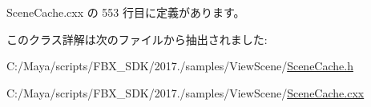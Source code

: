  Scene\+Cache.\+cxx の 553 行目に定義があります。



このクラス詳解は次のファイルから抽出されました\+:\begin{DoxyCompactItemize}
\item 
C\+:/\+Maya/scripts/\+F\+B\+X\+\_\+\+S\+D\+K/2017./samples/\+View\+Scene/\hyperlink{_scene_cache_8h}{Scene\+Cache.\+h}\item 
C\+:/\+Maya/scripts/\+F\+B\+X\+\_\+\+S\+D\+K/2017./samples/\+View\+Scene/\hyperlink{_scene_cache_8cxx}{Scene\+Cache.\+cxx}\end{DoxyCompactItemize}
